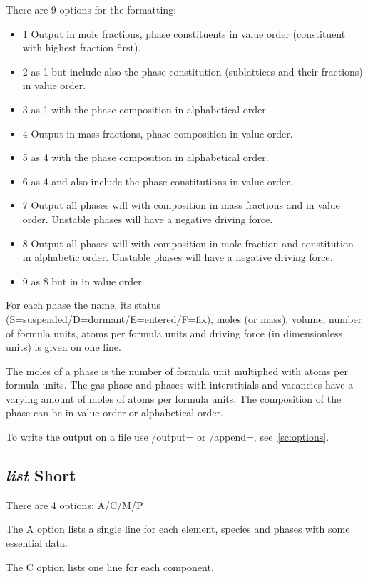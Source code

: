 \documentclass[11pt]{article}
\begin{document}
There are 9 options for the formatting:
\begin{itemize}
\item 1 Output in mole fractions, phase constituents in value order
  (constituent with highest fraction first).
\item 2 as 1 but include also the phase constitution (sublattices and
  their fractions) in value order.
\item 3 as 1 with the phase composition in alphabetical order
\item 4 Output in mass fractions, phase composition in value order.
\item 5 as 4 with the phase composition in alphabetical order.
\item 6 as 4 and also include the phase constitutions in value order.
\item 7 Output all phases will with composition in mass fractions and
  in value order.  Unstable phases will have a negative driving force.
\item 8 Output all phases will with composition in mole fraction and
  constitution in alphabetic order.  Unstable phases will have a
  negative driving force.
\item 9 as 8 but in in value order.
\end{itemize}

For each phase the name, its status
(S=suspended/D=dormant/E=entered/F=fix), moles (or mass), volume,
number of formula units, atoms per formula units and driving force (in
dimensionless units) is given on one line.

The moles of a phase is the number of formula unit multiplied with
atoms per formula units.  The gas phase and phases with interstitials
and vacancies have a varying amount of moles of atoms per formula
units.  The composition of the phase can be in value order or
alphabetical order.

To write the output on a file use /output= or /append=,
see~\ref{sc:options}.

\hypertarget{List short}{}
\subsection{{\em list} Short}

There are 4 options: A/C/M/P

The A option lists a single line for each element, species and phases
with some essential data.

The C option lists one line for each component.
\end{document}
